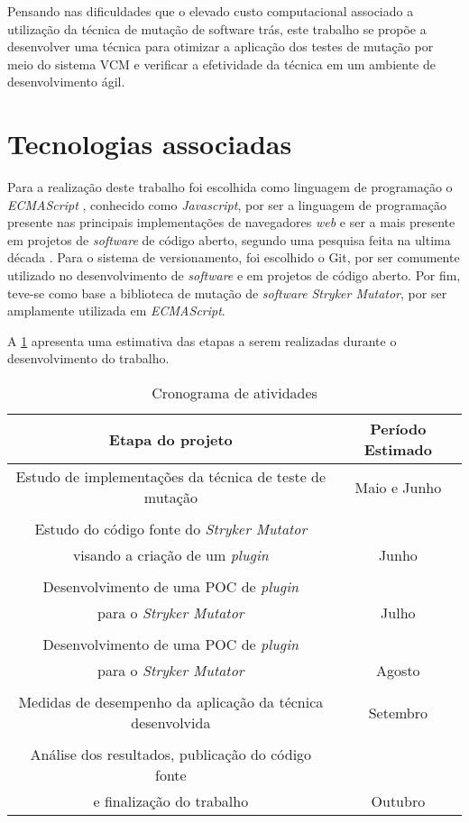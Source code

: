 
Pensando nas dificuldades que o elevado custo computacional associado a utilização da técnica de mutação de software trás, este trabalho se propõe a desenvolver uma técnica para otimizar a aplicação dos testes de mutação por meio do sistema VCM e verificar a efetividade da técnica em um ambiente de desenvolvimento ágil.


\section{Tecnologias associadas}

Para a realização deste trabalho foi escolhida como linguagem de programação o \textit{ECMAScript} \cite{ecma:spec}, conhecido como \textit{Javascript}, por ser a linguagem de programação presente nas principais implementações de navegadores \textit{web} \cite{ecma:mozilla} e ser a mais presente em projetos de \textit{software} de código aberto, segundo uma pesquisa feita na ultima década \cite{ieee:programming-langs}. Para o sistema de versionamento, foi escolhido o Git, por ser comumente utilizado no desenvolvimento de \textit{software} e em projetos de código aberto. Por fim, teve-se como base a biblioteca de mutação de \textit{software} \textit{Stryker Mutator}, por ser amplamente utilizada em \textit{ECMAScript}.

A \cref{tbl:cronograma} apresenta uma estimativa das etapas a serem realizadas durante
o desenvolvimento do trabalho.

\begin{table}[ht]
\centering
\begin{tabular}{c | c}
Etapa do projeto & Período Estimado \\ \hline
\hline
Estudo de implementações da técnica de teste de mutação  & Maio e Junho \\ \\ \hline
Estudo do código fonte do \textit{Stryker Mutator} \\ visando a criação de um \textit{plugin} & Junho \\ \\ \hline
Desenvolvimento de uma POC de \textit{plugin} \\ para o \textit{Stryker Mutator} & Julho \\ \\ \hline
Desenvolvimento de uma POC de \textit{plugin} \\ para o \textit{Stryker Mutator} & Agosto \\ \\ \hline
Medidas de desempenho da aplicação da técnica desenvolvida & Setembro \\ \\ \hline
Análise dos resultados, publicação do código fonte \\ e finalização do trabalho & Outubro \\ \hline
\end{tabular}
\caption{Cronograma de atividades}
\label{tbl:cronograma}
\end{table}

